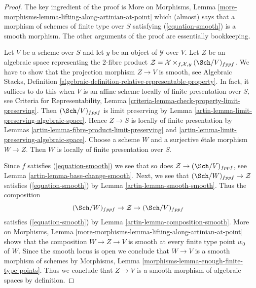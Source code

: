 \begin{proof}

The key ingredient of the proof is More on Morphisms, Lemma
\ref{more-morphisms-lemma-lifting-along-artinian-at-point}
which (almost) says that a morphism of schemes of finite type over $S$
satisfying (\ref{equation-smooth}) is a smooth morphism. The other
arguments of the proof are essentially bookkeeping.

\medskip\noindent
Let $V$ be a scheme over $S$ and let $y$ be an object of $\mathcal{Y}$ over
$V$. Let $Z$ be an algebraic space representing the $2$-fibre product
$\mathcal{Z} = \mathcal{X} \times_{f, \mathcal{X}, y} (\Sch/V)_{fppf}$.
We have to show that the projection morphism $Z \to V$ is smooth, see
Algebraic Stacks, Definition
\ref{algebraic-definition-relative-representable-property}.
In fact, it suffices to do this when $V$ is an affine scheme
locally of finite presentation over $S$, see
Criteria for Representability, Lemma
\ref{criteria-lemma-check-property-limit-preserving}.
Then $(\Sch/V)_{fppf}$ is limit preserving by
Lemma \ref{artin-lemma-limit-preserving-algebraic-space}.
Hence $Z \to S$ is locally of finite presentation by
Lemmas \ref{artin-lemma-fibre-product-limit-preserving} and
\ref{artin-lemma-limit-preserving-algebraic-space}.
Choose a scheme $W$ and a surjective \'etale morphism $W \to Z$.
Then $W$ is locally of finite presentation over $S$.

\medskip\noindent
Since $f$ satisfies (\ref{equation-smooth}) we see that so does
$\mathcal{Z} \to (\Sch/V)_{fppf}$, see Lemma \ref{artin-lemma-base-change-smooth}.
Next, we see that $(\Sch/W)_{fppf} \to \mathcal{Z}$ satisfies
(\ref{equation-smooth}) by Lemma \ref{artin-lemma-smooth-smooth}.
Thus the composition
$$
(\Sch/W)_{fppf} \to \mathcal{Z} \to (\Sch/V)_{fppf}
$$
satisfies (\ref{equation-smooth}) by Lemma \ref{artin-lemma-composition-smooth}.
More on Morphisms, Lemma
\ref{more-morphisms-lemma-lifting-along-artinian-at-point}
shows that the composition $W \to Z \to V$ is smooth at every finite type
point $w_0$ of $W$. Since the smooth locus is open we conclude
that $W \to V$ is a smooth morphism of schemes by
Morphisms, Lemma \ref{morphisms-lemma-enough-finite-type-points}.
Thus we conclude that $Z \to V$ is a smooth morphism
of algebraic spaces by definition.
\end{proof}

